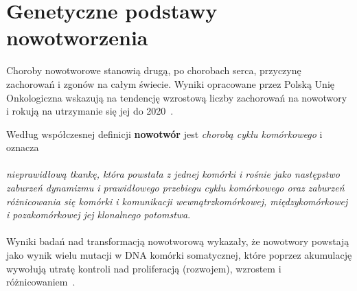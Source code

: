 \section{Genetyczne podstawy nowotworzenia}\label{cha:gen}
Choroby nowotworowe stanowią drugą, po chorobach serca, przyczynę zachorowań i zgonów na całym świecie. Wyniki opracowane przez Polską Unię Onkologiczna wskazują na tendencję wzrostową liczby zachorowań na nowotwory i rokują na utrzymanie się jej do 2020~\cite{zikula}.

Według współczesnej definicji \textbf{nowotwór} jest \textit{chorobą cyklu komórkowego} i oznacza \cite{zikula2} \\ \ \\ \textit{nieprawidłową tkankę, która powstała z jednej komórki i rośnie jako następstwo zaburzeń dynamizmu i prawidłowego przebiegu cyklu komórkowego oraz zaburzeń różnicowania się komórki i komunikacji wewnątrzkomórkowej, międzykomórkowej i pozakomórkowej jej klonalnego potomstwa}. \\ \ \\
Wyniki badań nad transformacją nowotworową wykazały, że nowotwory powstają jako wynik wielu mutacji w DNA komórki somatycznej, które poprzez akumulację wywołują utratę kontroli nad proliferacją (rozwojem), wzrostem i różnicowaniem~\cite{zikula5}.


